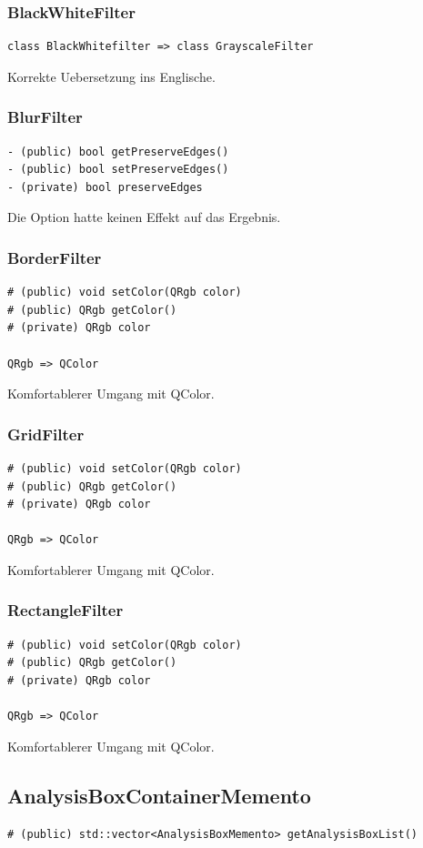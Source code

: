 \documentclass{scrartcl}
\begin{document}
{\subsubsection{BlackWhiteFilter}
\begin{verbatim}
class BlackWhitefilter => class GrayscaleFilter
\end{verbatim}
Korrekte Uebersetzung ins Englische.

\subsubsection{BlurFilter}
\begin{verbatim}
- (public) bool getPreserveEdges()
- (public) bool setPreserveEdges()
- (private) bool preserveEdges
\end{verbatim}
Die Option hatte keinen Effekt auf das Ergebnis.

\subsubsection{BorderFilter}
\begin{verbatim}
# (public) void setColor(QRgb color)
# (public) QRgb getColor()
# (private) QRgb color

QRgb => QColor
\end{verbatim}
Komfortablerer Umgang mit QColor.

\subsubsection{GridFilter}
\begin{verbatim}
# (public) void setColor(QRgb color)
# (public) QRgb getColor()
# (private) QRgb color

QRgb => QColor
\end{verbatim}
Komfortablerer Umgang mit QColor.
\subsubsection{RectangleFilter}
\begin{verbatim}
# (public) void setColor(QRgb color)
# (public) QRgb getColor()
# (private) QRgb color

QRgb => QColor
\end{verbatim}
Komfortablerer Umgang mit QColor.
\subsection{AnalysisBoxContainerMemento}
\begin{verbatim}
# (public) std::vector<AnalysisBoxMemento> getAnalysisBoxList()


\end{verbatim}}
\end{document}
